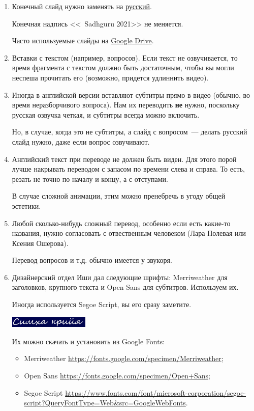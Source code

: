 \documentclass[
a4paper, %
12pt, %
article,
onecolumn, %
openany, %
]{memoir}
\begin{document}
\begin{enumerate}
\item Конечный слайд нужно заменять на \href{https://drive.google.com/file/d/11NbSgvq8LbxDcy-a2WY5OJTKUZKcZx88/view?usp=sharing}{русский}. 

	Конечная надпись <<\textcopyright\ Sadhguru 2021>> не меняется.

 Часто используемые слайды на 
\href{https://drive.google.com/drive/folders/1O54z3DtKpl90ut0Aa8wYkEEP37e00zPY?usp=sharing}{Google Drive}.

\item Вставки с текстом (например, вопросов). Если текст не озвучивается, то время фрагмента с текстом должно быть достаточным, чтобы вы могли неспеша прочитать его (возможно, придется удлиннить видео).

\item Иногда в английской версии вставляют субтитры прямо в видео
    {\color{gray}(обычно, во время неразборчивого вопроса)}. Нам их переводить
    \textbf{не} нужно, поскольку русская озвучка четкая, 
    и субтитры всегда можно включить.

    Но, в случае, когда это не субтитры, а слайд с вопросом~--- 
    делать русский слайд нужно, даже если вопрос озвучивают.
\item Английский текст при переводе не должен быть виден. Для этого порой лучше
    накрывать переводом с запасом по времени слева и справа. То есть, резать
    не точно по началу и концу, а с отступами.

    В случае сложной анимации, этим можно пренебречь в угоду общей эстетики.

\item Любой сколько-нибудь сложный перевод, особенно если есть какие-то названия, нужно согласовать с отвественным человеком (Лара Полевая или Ксения Ошерова).

	Перевод вопросов и т.д. обычно имеется у звукоря.

\item Дизайнерский отдел Иши дал следующие шрифты: Merriweather для заголовков, крупного текста и Open Sans для субтитров. Используем их.

    Иногда используется Segoe Script, вы его сразу заметите.

 \includegraphics[width=0.3\textwidth]{segoeScript}

    Их можно скачать и установить из Google Fonts:
    \begin{itemize}
        \item  Merriweather \href{https://fonts.google.com/specimen/Merriweather}{\small https://fonts.google.com/specimen/Merriweather};
        \item Open Sans \href{https://fonts.google.com/specimen/Open+Sans}{\small https://fonts.google.com/specimen/Open+Sans};
    \item Segoe Script \href{https://www.fonts.com/font/microsoft-corporation/segoe-script?QueryFontType=Web&src=GoogleWebFonts}{\small https://www.fonts.com/font/microsoft-corporation/segoe-script?QueryFontType=Web\&src=GoogleWebFonts}.
      \end{itemize}


\end{enumerate}
\end{document}

